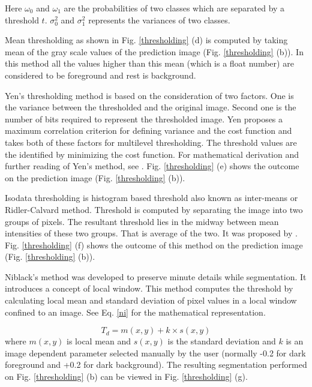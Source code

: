 \documentclass[11pt]{article}
\begin{document}
Here $\omega_{0}$ and $\omega_{1}$ are the probabilities of two classes which are separated by a threshold $t$. $\sigma_{0}^{2}$ and $\sigma_{1}^{2}$ represents the variances of two classes.


Mean thresholding as shown in Fig. \ref{thresholding} (d) is computed by taking mean of the gray scale values of the prediction image (Fig. \ref{thresholding} (b)). In this method all the values higher than this mean (which is a float number) are considered to be foreground and rest is background.

Yen's thresholding method is based on the consideration of two factors. One is the variance between the thresholded and the original image. Second one is the number of bits required to represent the thresholded image. Yen proposes a maximum correlation criterion for defining variance and the cost function and takes both of these factors for multilevel thresholding. The threshold values are the identified by minimizing the cost function. For mathematical derivation and further reading of Yen's method, see \cite{yen1995new}. Fig. \ref{thresholding} (e) shows the outcome on the prediction image (Fig. \ref{thresholding} (b)).

Isodata thresholding is histogram based threshold also known as inter-means or Ridler-Calvard method. Threshold is computed by separating the image into two groups of pixels. The resultant threshold lies in the midway between mean intensities of these two groups. That is average of the two. It was proposed by \cite{ridler1978picture}. Fig. \ref{thresholding} (f) shows the outcome of this method on the prediction image (Fig. \ref{thresholding} (b)).

Niblack's method was developed to preserve minute details while segmentation. It introduces a concept of local window. This method computes the threshold by calculating local mean and standard deviation of pixel values in a local window confined to an image. See Eq. \ref{ni} for the mathematical representation.

\begin{equation}
T_{d}=m(x, y)+k \times s(x, y)
\label{ni}
\end{equation}
where $m(x, y)$ is local mean and $s(x, y)$ is the standard deviation and $k$ is an image dependent parameter selected manually by the user (normally -0.2 for dark foreground and +0.2 for dark background). The resulting segmentation performed on Fig. \ref{thresholding} (b) can be viewed in Fig. \ref{thresholding} (g).
\end{document}
